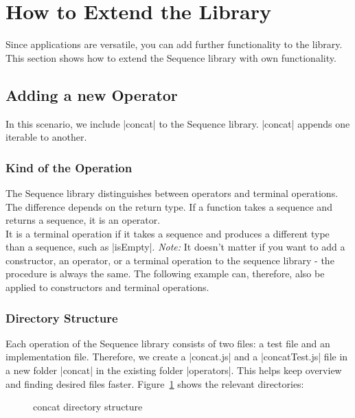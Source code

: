 \section{How to Extend the Library}
\label{sec:How to Extend the Library}
Since applications are versatile, you can add further functionality
to the library. This section shows how to extend the Sequence library with
own functionality.
\subsection{Adding a new Operator}
\label{sub:Adding a new Operator}
In this scenario, we include |concat| to the Sequence library. |concat| appends
one iterable to another.

\subsubsection{Kind of the Operation}
\label{subsub:Kind of the Operation}
The Sequence library distinguishes between operators and terminal operations. The
difference depends on the return type. If a function takes a sequence and
returns a sequence, it is an operator. \\ 
It is a terminal operation if it takes a sequence and produces a different type
than a sequence, such as |isEmpty|.
\newline
\textit{Note:} It doesn't matter if you want to add a constructor, an operator, or a terminal
operation to the sequence library - the procedure is always the same. The
following example can, therefore, also be applied to constructors and terminal
operations.

\subsubsection{Directory Structure}
\label{subsub:Directory Structure}
Each operation of the Sequence library consists of two files: a test file and
an implementation file. Therefore, we create a |concat.js| and a
|concatTest.js| file in a new folder |concat| in the existing folder
|operators|. This helps keep overview and finding desired files faster.
Figure~\ref{fig:concat_dir} shows the relevant directories:

\begin{figure}[H]
  \caption{concat directory structure}
  \label{fig:concat_dir}
\end{figure}

